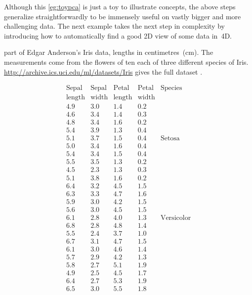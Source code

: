 Although this \cref{eg:toypca} is just a toy to illustrate concepts, the above steps generalize straightforwardly to be immensely useful on vastly bigger and more challenging data.
The next example takes the next step in complexity by introducing how to automatically find a good 2D view of some data in~4D.





\begin{example} \label{eg:eaid}
\begin{table}
\caption{part of Edgar Anderson's Iris data, lengths in centimetres~(cm).  
The measurements come from the flowers of ten each of three different species of Iris.
\protect\url{http://archive.ics.uci.edu/ml/datasets/Iris} gives the full dataset \cite[]{Dua2019}.
}
\label{tbl:eaid}
\begin{equation*}
\begin{array}{rrrrl}
\hline
\text{Sepal}&\text{Sepal}&\text{Petal}&\text{Petal}&\text{Species}
\\\text{length}&\text{width}&\text{length}&\text{width}&
\\\hline
  4.9&3.0&1.4&0.2&
\\4.6&3.4&1.4&0.3&
\\4.8&3.4&1.6&0.2&
\\5.4&3.9&1.3&0.4&
\\5.1&3.7&1.5&0.4&\text{Setosa}
\\5.0&3.4&1.6&0.4&
\\5.4&3.4&1.5&0.4&
\\5.5&3.5&1.3&0.2&
\\4.5&2.3&1.3&0.3&
\\5.1&3.8&1.6&0.2&
\\\hline
  6.4&3.2&4.5&1.5&
\\6.3&3.3&4.7&1.6&
\\5.9&3.0&4.2&1.5&
\\5.6&3.0&4.5&1.5&
\\6.1&2.8&4.0&1.3&\text{Versicolor}
\\6.8&2.8&4.8&1.4&
\\5.5&2.4&3.7&1.0&
\\6.7&3.1&4.7&1.5&
\\6.1&3.0&4.6&1.4&
\\5.7&2.9&4.2&1.3&
\\\hline
  5.8&2.7&5.1&1.9&
\\4.9&2.5&4.5&1.7&
\\6.4&2.7&5.3&1.9&
\\6.5&3.0&5.5&1.8&

\end{array}
\end{equation*}
\end{table}
\end{example}
